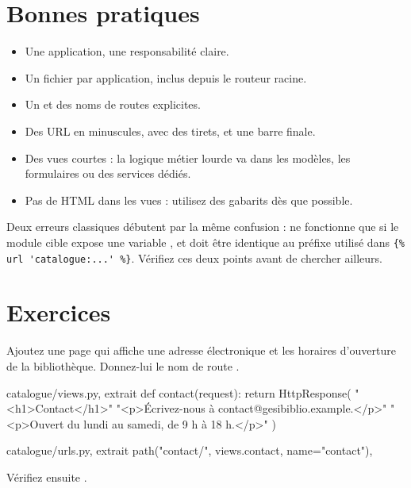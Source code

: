 \section{Bonnes pratiques}

\begin{bonne}
\begin{itemize}
  \item Une application, une responsabilité claire.
  \item Un fichier  par application, inclus depuis le routeur racine.
  \item Un  et des noms de routes explicites.
  \item Des URL en minuscules, avec des tirets, et une barre finale.
  \item Des vues courtes : la logique métier lourde va dans les modèles, les
        formulaires ou des services dédiés.
  \item Pas de HTML dans les vues : utilisez des gabarits dès que possible.
\end{itemize}
\end{bonne}

\begin{piege}
Deux erreurs classiques débutent par la même confusion :  ne
fonctionne que si le module cible expose une variable , et
 doit être identique au préfixe utilisé dans
\lstinline|{% url 'catalogue:...' %}|. Vérifiez ces deux points avant de chercher
ailleurs.
\end{piege}

\section{Exercices}

\begin{exercice}
Ajoutez une page  qui affiche une adresse électronique et les
horaires d'ouverture de la bibliothèque. Donnez-lui le nom de route
.
\end{exercice}

\begin{correction}
\begin{codebox}[python]{catalogue/views.py, extrait}
def contact(request):
    return HttpResponse(
        "<h1>Contact</h1>"
        "<p>Écrivez-nous à contact@gesibiblio.example.</p>"
        "<p>Ouvert du lundi au samedi, de 9 h à 18 h.</p>"
    )
\end{codebox}

\begin{codebox}[python]{catalogue/urls.py, extrait}
path("contact/", views.contact, name="contact"),
\end{codebox}

Vérifiez ensuite .
\end{correction}

